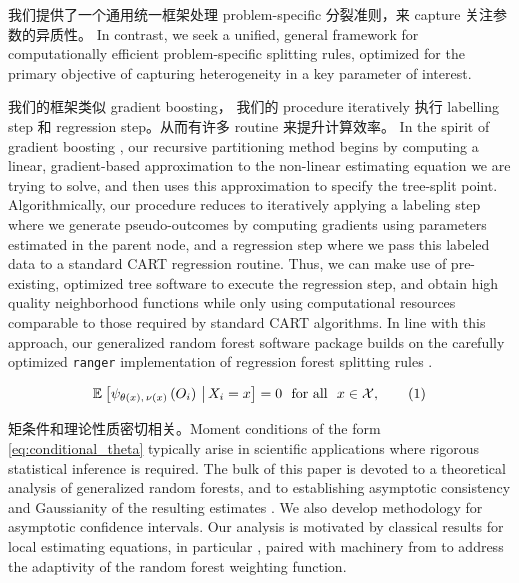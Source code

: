 \documentclass[aos]{imsart}
\theoremstyle{plain}
\theoremstyle{definition}
\theoremstyle{remark}
\begin{document}
\begin{CJK}{UTF8}{gbsn}
我们提供了一个通用统一框架处理 problem-specific 分裂准则，来 capture 关注参数的异质性。 In contrast, we seek a unified, general framework for computationally efficient problem-specific splitting rules,
optimized for the primary objective of capturing heterogeneity in a key parameter of interest.


我们的框架类似 gradient boosting， 我们的 procedure iteratively 执行 labelling step 和 regression step。从而有许多 routine 来提升计算效率。  In the spirit of gradient boosting \citep{friedman2001greedy}, our recursive partitioning
method begins by computing a linear, gradient-based approximation to the
non-linear estimating equation we are trying to solve, and then uses
this approximation to specify the tree-split point. Algorithmically, our procedure
reduces to iteratively applying a labeling step where we generate pseudo-outcomes
by computing gradients using parameters estimated in the parent node, and a regression step where we pass this labeled data
to a standard CART regression routine.  Thus, we can make use of pre-existing,
optimized tree software to execute the regression step, and obtain high quality
neighborhood functions while only using computational
resources comparable to those required by standard CART algorithms.  
In line with this approach, our generalized random forest software package
builds on the carefully optimized \texttt{ranger}
implementation of regression forest splitting rules \citep{wright2015ranger}.


\begin{equation*}
\EE{\psi_{\theta(x), \, \nu(x)}\p{O_i} \cond X_i = x} = 0 \ \text{ for all } \ x \in \xx, \qquad (1)
\end{equation*}

矩条件和理论性质密切相关。Moment conditions of the form \eqref{eq:conditional_theta} typically arise in
scientific applications where rigorous statistical inference is required.
The bulk of this paper is devoted to a theoretical analysis of generalized random
forests, and to establishing asymptotic consistency and Gaussianity of the resulting
estimates . We also develop methodology for asymptotic confidence
intervals. Our analysis is motivated by classical results for local estimating equations,
in particular \citet{newey1994kernel}, paired with machinery from
\citet{wager2015estimation} to address the adaptivity of the random forest weighting function.


\end{CJK}
\end{document}

